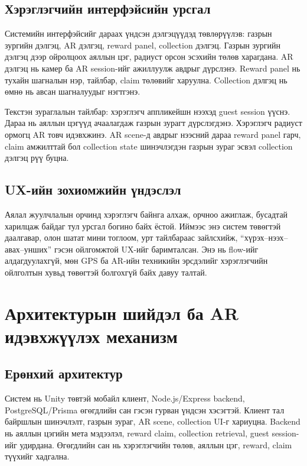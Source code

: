 \begin{sloppy}
\subsection{Хэрэглэгчийн интерфэйсийн урсгал}

Системийн интерфэйсийг дараах үндсэн дэлгэцүүдэд төвлөрүүлэв: газрын зургийн дэлгэц, AR дэлгэц, reward panel, collection дэлгэц. Газрын зургийн дэлгэц дээр ойролцоох аяллын цэг, радиуст орсон эсэхийн төлөв харагдана. AR дэлгэц нь камер ба AR session-ийг ажиллуулж авдрыг дүрслэнэ. Reward panel нь тухайн шагналын нэр, тайлбар, claim төлөвийг харуулна. Collection дэлгэц нь өмнө нь авсан шагналуудыг нэгтгэнэ.

Текстэн зураглалын тайлбар: хэрэглэгч аппликейшн нээхэд guest session үүснэ. Дараа нь аяллын цэгүүд ачаалагдаж газрын зурагт дүрслэгдэнэ. Хэрэглэгч радиуст ормогц AR товч идэвхжинэ. AR scene-д авдрыг нээсний дараа reward panel гарч, claim амжилттай бол collection state шинэчлэгдэн газрын зураг эсвэл collection дэлгэц рүү буцна.

\subsection{UX-ийн зохиомжийн үндэслэл}

Аялал жуулчлалын орчинд хэрэглэгч байнга алхаж, орчноо ажиглаж, бусадтай харилцаж байдаг тул урсгал богино байх ёстой. Иймээс энэ систем төвөгтэй даалгавар, олон шатат мини тоглоом, урт тайлбараас зайлсхийж, ``хүрэх--нээх--авах--унших'' гэсэн ойлгомжтой UX-ийг баримталсан. Энэ нь flow-ийг алдагдуулахгүй, мөн GPS ба AR-ийн техникийн эрсдэлийг хэрэглэгчийн ойлголтын хувьд төвөгтэй болгохгүй байх давуу талтай.

\section{Архитектурын шийдэл ба AR идэвхжүүлэх механизм}

\subsection{Ерөнхий архитектур}

Систем нь Unity төвтэй мобайл клиент, Node.js/Express backend, PostgreSQL/Prisma өгөгдлийн сан гэсэн гурван үндсэн хэсэгтэй. Клиент тал байршлын шинэчлэлт, газрын зураг, AR scene, collection UI-г хариуцна. Backend нь аяллын цэгийн мета мэдээлэл, reward claim, collection retrieval, guest session-ийг удирдана. Өгөгдлийн сан нь хэрэглэгчийн төлөв, аяллын цэг, reward, claim түүхийг хадгална.


\end{sloppy}
